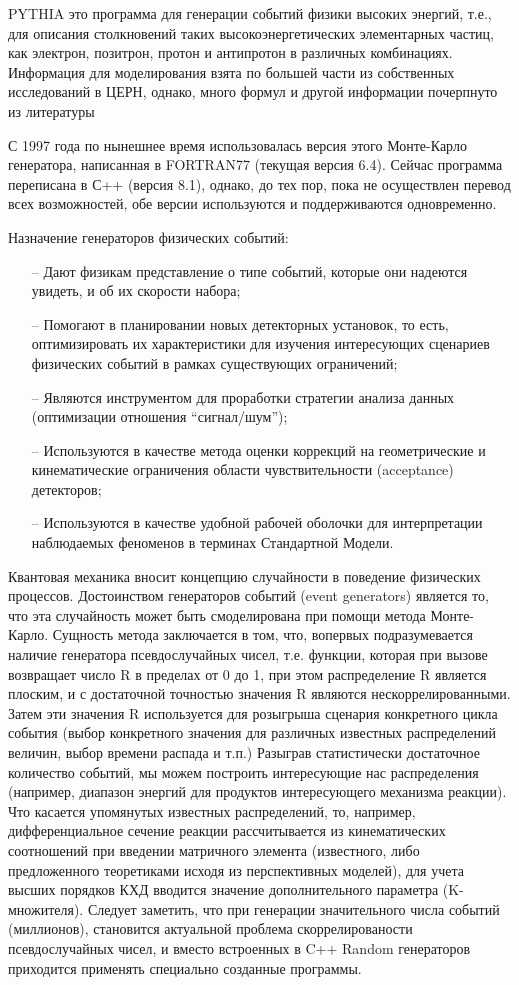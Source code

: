 PYTHIA это программа для генерации событий физики
высоких энергий, т.е., для описания столкновений таких
высокоэнергетических элементарных частиц, как электрон,
позитрон, протон и антипротон в различных комбинациях.
Информация для моделирования взята по большей части из
собственных исследований в ЦЕРН, однако, много формул и
другой информации почерпнуто из литературы

С 1997 года по нынешнее время использовалась версия
этого Монте-Карло генератора, написанная в FORTRAN77
(текущая версия 6.4). Сейчас программа переписана в С++
(версия 8.1), однако, до тех пор, пока не осуществлен
перевод всех возможностей, обе версии используются и
поддерживаются одновременно.


Назначение генераторов физических событий:
\begin{itemize}
	\item[--] Дают физикам представление о типе событий, которые
	они надеются увидеть, и об их скорости набора;
	\item[--] Помогают в планировании новых детекторных установок,
	то есть, оптимизировать их характеристики для изучения
	интересующих сценариев физических событий в рамках
	существующих ограничений;
	\item[--] Являются инструментом для проработки стратегии
	анализа данных (оптимизации отношения “сигнал/шум”);
	\item[--] Используются в качестве метода оценки коррекций на
	геометрические и кинематические ограничения области
	чувствительности (acceptance) детекторов;
	\item[--] Используются в качестве удобной рабочей оболочки для
	интерпретации наблюдаемых феноменов в терминах
	Стандартной Модели.
\end{itemize}

Квантовая механика вносит концепцию случайности в
поведение физических процессов. Достоинством
генераторов событий (event generators) является то, что эта
случайность может быть смоделирована при помощи метода
Монте-Карло. Сущность метода заключается в том, что, вопервых подразумевается наличие генератора
псевдослучайных чисел, т.е. функции, которая при вызове
возвращает число R в пределах от 0 до 1, при этом
распределение R является плоским, и с достаточной
точностью значения R являются нескоррелированными.
Затем эти значения R используется для розыгрыша сценария
конкретного цикла события (выбор конкретного значения
для различных известных распределений величин, выбор
времени распада и т.п.) Разыграв статистически достаточное
количество событий, мы можем построить интересующие
нас распределения (например, диапазон энергий для
продуктов интересующего механизма реакции).
Что касается упомянутых известных распределений,
то, например, дифференциальное сечение реакции
рассчитывается из кинематических соотношений при
введении матричного элемента (известного, либо
предложенного теоретиками исходя из перспективных
моделей), для учета высших порядков КХД вводится
значение дополнительного параметра (K-множителя).
Следует заметить, что при генерации значительного
числа событий (миллионов), становится актуальной
проблема скоррелированости псевдослучайных чисел, и
вместо встроенных в C++ Random генераторов приходится
применять специально созданные программы.


